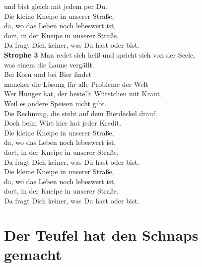 \documentclass[twoside,8pt]{scrartcl}
\begin{document}
und bist gleich mit jedem per Du. \\
Die kleine Kneipe in unserer Straße,\\
da, wo das Leben noch lebeswert ist, \\
dort, in der Kneipe in unserer Straße.\\
Da fragt Dich keiner, was Du hast oder bist.\\
\clearpage
\textbf{Strophe 3}
\newline
Man redet sich heiß und spricht sich von der Seele,\\
was einem die Laune vergällt.\\
Bei Korn und bei Bier findet\\
mancher die Lösung für alle Probleme der Welt\\
Wer Hunger hat, der bestellt Würstchen mit Kraut,\\
Weil es andere Speisen nicht gibt.\\
Die Rechnung, die steht auf dem Bierdeckel drauf.\\
Doch beim Wirt hier hat jeder Kredit.\\
Die kleine Kneipe in unserer Straße,\\
da, wo das Leben noch lebeswert ist,\\
dort, in der Kneipe in unserer Straße. \\
Da fragt Dich keiner, was Du hast oder bist.\\
Die kleine Kneipe in unserer Straße,\\
 da, wo das Leben noch lebeswert ist,\\
dort, in der Kneipe in unserer Straße. \\
Da fragt Dich keiner, was Du hast oder bist.\\



\clearpage
\section{Der Teufel hat den Schnaps gemacht}
\end{document}
